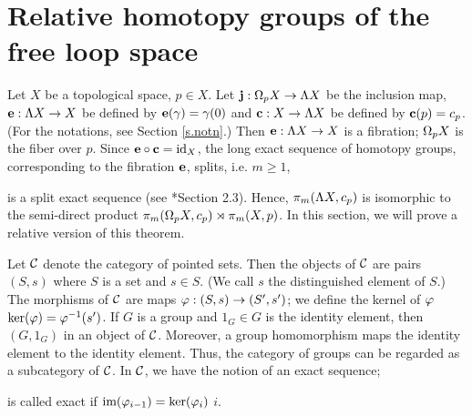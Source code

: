 \documentclass[11pt,twoside]{article}
\begin{document}
\section{Relative homotopy groups of the free loop space}
Let \(X\) be a topological space, \(p\in X\). Let \(\mathbf{j}:\Omega_pX\rightarrow \Lambda X\) be the inclusion map, \(\mathbf{e}:\Lambda X \rightarrow X\) be defined by \(\mathbf{e}(\gamma)=\gamma(0)\) and \(\mathbf{c}:X\rightarrow \Lambda X\) be defined by \(\mathbf{c}(p)=c_p\). (For the notations, see Section \ref{s.notn}.) Then \(\mathbf{e}:\Lambda X \rightarrow X\) is a fibration; \(\Omega_pX\) is the fiber over \(p\). Since \(\mathbf{e}\circ\mathbf{c}=\text{id}_X\), the long exact sequence of homotopy groups, corresponding to the fibration \(\mathbf{e}\), splits, i.e. \fa \(m\geq 1\),
\begin{center}
\end{center}
is a split exact sequence (see \cite{Moore}*{Section 2.3}). Hence, \(\pi_m(\Lambda X, c_p)\) is isomorphic to the semi-direct product  \(\pi_m(\Omega_p X, c_p)\rtimes \pi_m(X, p)\). In this section, we will prove a relative version of this theorem.

Let \(\mathcal{C}\) denote the category of pointed sets. Then the objects of \(\mathcal{C}\) are pairs \((S,s)\) where \(S\) is a set and \(s\in S\). (We call $s$ the distinguished element of $S$.) The morphisms of \(\mathcal{C}\) are maps \(\varphi:(S,s)\rightarrow (S',s')\); we define the kernel of $\varphi$ \(\ker(\varphi)=\varphi^{-1}(s')\). If $G$ is a group and \(1_G\in G\) is the identity element, then \((G,1_G)\) in an object of \(\mathcal{C}\). Moreover, a group homomorphism maps the identity element to the identity element. Thus, the category of groups can be regarded as a subcategory of \(\mathcal{C}\). In $\mathcal{C}$, we have the notion of an exact sequence; 

\begin{center}
\end{center}
is called exact if \(\text{im}(\varphi_{i-1})=\ker(\varphi_i)\) \fa $i$. 
\end{document}

